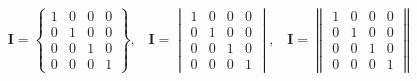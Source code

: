 \documentclass{article}
\begin{document}
\begin{equation}
    \textbf{I}=\begin{Bmatrix}
    1&0&0&0 \\
    0&1&0&0 \\
    0&0&1&0 \\
    0&0&0&1
    \end{Bmatrix},\;\;\;
    \textbf{I}=\begin{vmatrix}
    1&0&0&0 \\
    0&1&0&0 \\
    0&0&1&0 \\
    0&0&0&1
    \end{vmatrix},\;\;\;
    \textbf{I}=\begin{Vmatrix}
    1&0&0&0 \\
    0&1&0&0 \\
    0&0&1&0 \\
    0&0&0&1
    \end{Vmatrix}
\end{equation}
\bigskip
\end{document}
